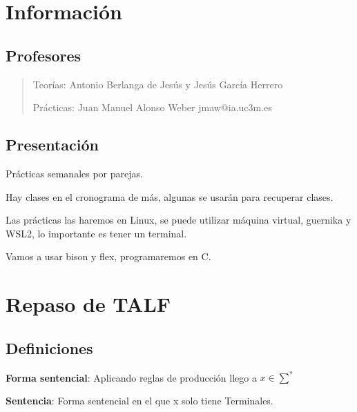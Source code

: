 \documentclass[12pt, twoside, openright]{report} %
\begin{document}
\listoffigures
\thispagestyle{fancy}

\listoftables
\thispagestyle{fancy}

\clearpage
{} %



\chapter{Información}
\section{Profesores}

\begin{quote}
Teorías: Antonio Berlanga de Jesús y Jesús García Herrero

Prácticas: Juan Manuel Alonso Weber jmaw@ia.uc3m.es
\end{quote}

\section{Presentación}

Prácticas semanales por parejas.

Hay clases en el cronograma de más, algunas se usarán para recuperar clases.

Las prácticas las haremos en Linux, se puede utilizar máquina virtual, guernika y WSL2, lo importante es tener un terminal.

Vamos a usar bison y flex, programaremos en C.

\chapter{Repaso de TALF}

\section{Definiciones}

\textbf{Forma sentencial}: Aplicando reglas de producción llego a \(x \in \sum^*\)

\textbf{Sentencia}: Forma sentencial en el que x solo tiene Terminales.
\end{document}
